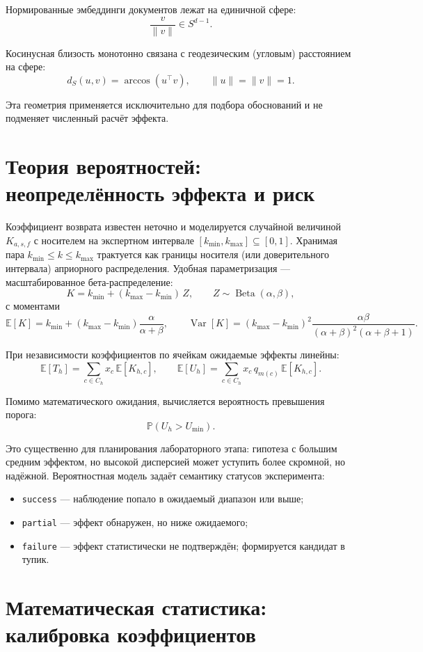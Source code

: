 \documentclass[12pt,a4paper]{article}
\newcommand{\code}[1]{\texttt{#1}}
\newcommand{\E}{\mathbb{E}}
\newcommand{\Prob}{\mathbb{P}}
\begin{document}
Нормированные эмбеддинги документов лежат на единичной сфере:
\[
  \frac{v}{\|v\|} \in S^{d-1}.
\]

Косинусная близость монотонно связана с геодезическим (угловым) расстоянием
на сфере:
\[
  d_S(u,v) = \arccos(u^\top v),
  \qquad \|u\| = \|v\| = 1.
\]

Эта геометрия применяется исключительно для подбора обоснований и не
подменяет численный расчёт эффекта.

\section{Теория вероятностей: неопределённость эффекта и риск}

Коэффициент возврата известен неточно и моделируется случайной величиной
\(K_{a,s,f}\) с носителем на экспертном интервале
\([k_{\min}, k_{\max}] \subseteq [0,1]\). Хранимая пара
\(k_{\min} \le k \le k_{\max}\) трактуется как границы носителя (или
доверительного интервала) априорного распределения. Удобная параметризация ---
масштабированное бета-распределение:
\[
  K = k_{\min} + (k_{\max}-k_{\min})\,Z,
  \qquad Z \sim \operatorname{Beta}(\alpha,\beta),
\]
с моментами
\[
  \E[K] = k_{\min} + (k_{\max}-k_{\min})\frac{\alpha}{\alpha+\beta},
  \qquad
  \operatorname{Var}[K] =
  (k_{\max}-k_{\min})^2
  \frac{\alpha\beta}{(\alpha+\beta)^2(\alpha+\beta+1)}.
\]

При независимости коэффициентов по ячейкам ожидаемые эффекты линейны:
\[
  \E[T_h] =
  \sum_{c \in C_h} x_c\, \E[K_{h,c}],
  \qquad
  \E[U_h] =
  \sum_{c \in C_h} x_c\, q_{m(c)}\, \E[K_{h,c}].
\]

Помимо математического ожидания, вычисляется вероятность превышения порога:
\[
  \Prob(U_h > U_{\min}).
\]

Это существенно для планирования лабораторного этапа: гипотеза с большим
средним эффектом, но высокой дисперсией может уступить более скромной, но
надёжной. Вероятностная модель задаёт семантику статусов эксперимента:
\begin{itemize}
  \item \code{success} --- наблюдение попало в ожидаемый диапазон или выше;
  \item \code{partial} --- эффект обнаружен, но ниже ожидаемого;
  \item \code{failure} --- эффект статистически не подтверждён;
    формируется кандидат в тупик.
\end{itemize}

\section{Математическая статистика: калибровка коэффициентов}
\end{document}
